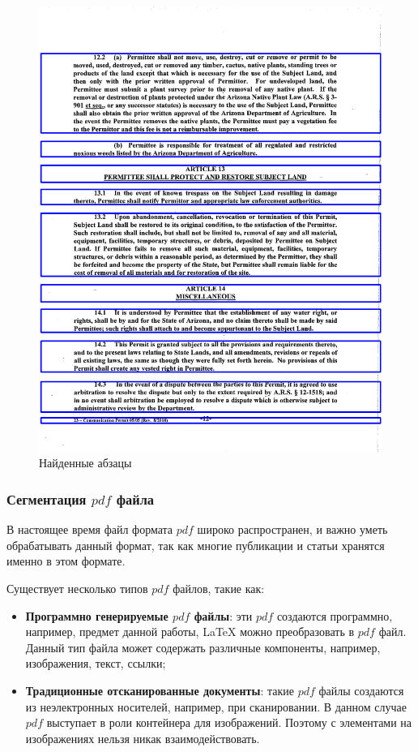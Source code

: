\begin{figure}
    \includegraphics[scale=0.2]{img/paragraph/out.png}
    \caption{Найденные абзацы}
    \label{segmentation_output}
\end{figure}

\subsubsection{Сегментация $pdf$ файла}
В настоящее время файл формата $pdf$ широко распространен, и важно уметь обрабатывать данный формат, так как многие публикации и статьи хранятся именно в этом формате.

Существует несколько типов $pdf$ файлов, такие как:
\begin{itemize}
    \item \textbf{Программно генерируемые $pdf$ файлы}: эти $pdf$ создаются программно, например, предмет данной работы, \LaTeX\; можно преобразовать в $pdf$ файл. Данный тип файла может содержать различные компоненты, например, изображения, текст, ссылки;
    \item \textbf{Традиционные отсканированные документы}: такие $pdf$ файлы создаются из неэлектронных носителей, например, при сканировании. В данном случае $pdf$ выступает в роли контейнера для изображений. Поэтому с элементами на изображениях нельзя никак взаимодействовать.
\end{itemize}

